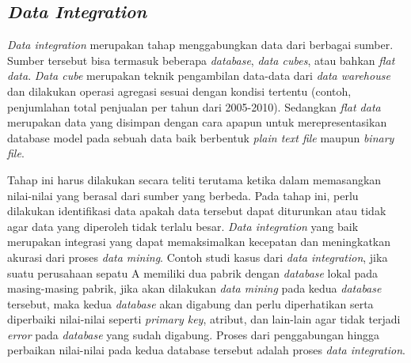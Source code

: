 

\subsection{\textsl{Data Integration}}
\textsl{Data integration} merupakan tahap menggabungkan data dari berbagai sumber. Sumber tersebut bisa termasuk beberapa \textsl{database}, \textsl{data cubes}, atau bahkan \textsl{flat data}. \textsl{Data cube} merupakan teknik pengambilan data-data dari \textsl{data warehouse} dan dilakukan operasi agregasi sesuai dengan kondisi tertentu (contoh, penjumlahan total penjualan per tahun dari 2005-2010). Sedangkan \textsl{flat data} merupakan data yang disimpan dengan cara apapun untuk merepresentasikan database model pada sebuah data baik berbentuk \textsl{plain text file} maupun \textsl{binary file}. 

Tahap ini harus dilakukan secara teliti terutama ketika dalam memasangkan nilai-nilai yang berasal dari sumber yang berbeda. Pada tahap ini, perlu dilakukan identifikasi data apakah data tersebut dapat diturunkan atau tidak agar data yang diperoleh tidak terlalu besar. \textsl{Data integration} yang baik merupakan integrasi yang dapat memaksimalkan kecepatan dan meningkatkan akurasi dari proses \textsl{data mining}. Contoh studi kasus dari \textsl{data integration}, jika suatu perusahaan sepatu A memiliki dua pabrik dengan \textsl{database} lokal pada masing-masing pabrik, jika akan dilakukan \textsl{data mining} pada kedua \textsl{database }tersebut, maka kedua \textsl{database} akan digabung dan perlu diperhatikan serta diperbaiki nilai-nilai seperti \textsl{primary key}, atribut, dan lain-lain agar tidak terjadi \textsl{error} pada \textsl{database} yang sudah digabung. Proses dari penggabungan hingga perbaikan nilai-nilai pada kedua database tersebut adalah proses \textsl{data integration}.

